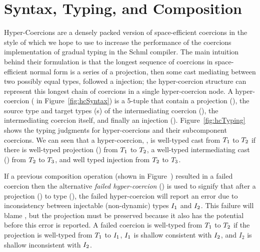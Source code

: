 \documentclass[acmtog, authorversion, acmlarge]{acmart}
\begin{document}
\newcommand{\cwt}[3]{\ensuremath{\vdash \, #1 \, : \, #2 \Rightarrow #3}}

\newcommand{\cast}[3][\Lbl]{\ensuremath{#2 \Rightarrow^{#1} #3}}
\newcommand{\mkcrcn}[3][\Lbl]{\ensuremath{\langle \cast[#1]{#2}{#3} \rangle}}
\newcommand{\mkIcrcn}[3][\Lbl]{\ensuremath{\{ \cast[#1]{#2}{#3} \}}}
\newcommand{\mkmed}[3][\Lbl]{\ensuremath{\langle \widehat{\cast[#1]{#2}{#3}} \rangle}}

\newcommand{\cmp}[2]{\ensuremath{#1 \fatsemi #2}}
\newcommand{\cmpm}[2]{\cmp{#1}{#2}}

\newcommand{\depth}[1]{\ensuremath{\mid #1 \mid}}
\newcommand{\Max}[1]{\ensuremath{\texttt{max}(#1)}}

\newcommand{\interp}[3]{%
  \ensuremath{\llbracket #1 \rrbracket_{#3}^{#2}}}

\section{Syntax, Typing, and Composition}
\label{sec:hc}

Hyper-Coercions are a densely packed version of space-efficient
coercions in the style of \citet{Siek:2015ab} which we hope to use to
increase the performance of the coercions implementation of gradual
typing in the Schml compiler. The main intuition behind their
formulation is that the longest sequence of coercions in
space-efficient normal form is a series of a projection, then some
cast mediating between two possibly equal types, followed a injection;
the hyper-coercion structure can represent this longest chain of
coercions in a single hyper-coercion node. A hyper-coercion (\HC \; in
Figure~\ref{fig:hcSyntax}) is a 5-tuple that contain a projection
(\Prj), the source type and target types (\T{}s) of the intermediating
coercion (\Med), the intermediating coercion itself, and finally an
injection (\Inj). Figure~\ref{fig:hcTyping} shows the typing judgments
for hyper-coercions and their subcomponent coercions.  We can seen
that a hyper-coercion, , is
well-typed cast from $T_1$ to $T_2$ if there is well-typed
projection (\Prj) from $T_1$ to $T_2$, a well-typed intermediating
cast (\Med) from $T_2$ to $T_3$, and well typed injection from
$T_2$ to $T_3$.

If a previous composition operation (shown in
Figure~) resulted in a failed coercion then the
alternative \emph{failed hyper-coercion}
() is used to signify that
after a projection (\Prj) to type (\T), the failed hyper-coercion will
report an error due to inconsistency between injectable (non-dynamic)
types $I_1$ and $I_2$. This failure will blame \Lbl, but the
projection must be preserved because it also has the potential before
this error is reported. A failed coercion is well-typed from $T_1$ to
$T_2$ if the projection is well-typed from $T_1$ to $I_1$, $I_1$
is shallow consistent with $I_2$, and $I_2$ is shallow inconsistent
with $I_2$.
\end{document}
